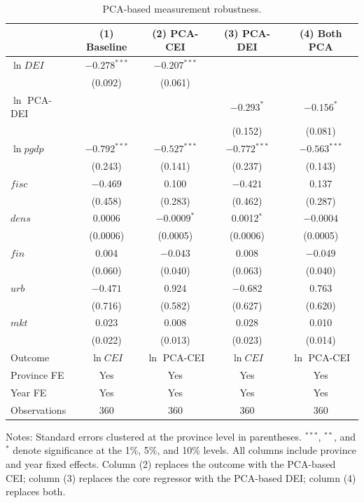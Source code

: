 \documentclass[economies,article,submit,moreauthors]{Definitions/mdpi}
\begin{document}
\begin{table}[!htbp]
\centering
\caption{PCA-based measurement robustness.}
\label{tab:pca_robust}
\footnotesize
\setlength{\tabcolsep}{6pt}
\begin{threeparttable}
\begin{tabular}{lcccc}
\toprule
 & (1) Baseline & (2) PCA-CEI & (3) PCA-DEI & (4) Both PCA\\
\midrule
$\ln DEI$ & $-0.278^{***}$ & $-0.207^{***}$ & &\\
 & (0.092) & (0.061) & &\\
$\ln$ PCA-DEI & & & $-0.293^{*}$ & $-0.156^{*}$\\
 & & & (0.152) & (0.081)\\
\midrule
$\ln pgdp$ & $-0.792^{***}$ & $-0.527^{***}$ & $-0.772^{***}$ & $-0.563^{***}$\\
 & (0.243) & (0.141) & (0.237) & (0.143)\\
$fisc$ & $-0.469$ & 0.100 & $-0.421$ & 0.137\\
 & (0.458) & (0.283) & (0.462) & (0.287)\\
$dens$ & 0.0006 & $-0.0009^{*}$ & 0.0012$^{*}$ & $-0.0004$\\
 & (0.0006) & (0.0005) & (0.0006) & (0.0005)\\
$fin$ & 0.004 & $-0.043$ & 0.008 & $-0.049$\\
 & (0.060) & (0.040) & (0.063) & (0.040)\\
$urb$ & $-0.471$ & 0.924 & $-0.682$ & 0.763\\
 & (0.716) & (0.582) & (0.627) & (0.620)\\
$mkt$ & 0.023 & 0.008 & 0.028 & 0.010\\
 & (0.022) & (0.013) & (0.023) & (0.014)\\
\midrule
Outcome & $\ln CEI$ & $\ln$ PCA-CEI & $\ln CEI$ & $\ln$ PCA-CEI\\
Province FE & Yes & Yes & Yes & Yes\\
Year FE & Yes & Yes & Yes & Yes\\
Observations & 360 & 360 & 360 & 360\\
\bottomrule
\end{tabular}
\begin{tablenotes}\footnotesize
\item Notes: Standard errors clustered at the province level in parentheses. $^{***}$, $^{**}$, and $^{*}$ denote significance at the 1\%, 5\%, and 10\% levels. All columns include province and year fixed effects. Column (2) replaces the outcome with the PCA-based CEI; column (3) replaces the core regressor with the PCA-based DEI; column (4) replaces both.
\end{tablenotes}
\end{threeparttable}
\end{table}
\end{document}
